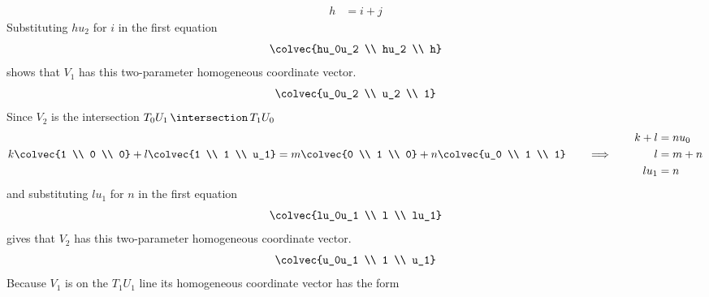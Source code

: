 \begin{ans}{7}
\begin{exparts}
\begin{equation*}
\begin{aligned}
              h    &= i+j
            \end{aligned}
          \end{equation*}
          Substituting $hu_2$ for $i$ in the first equation
          \begin{equation*}
            \colvec{hu_0u_2 \\ hu_2 \\ h}
          \end{equation*}
          shows that $V_1$ has this
          two-parameter homogeneous coordinate vector.
          \begin{equation*}
            \colvec{u_0u_2 \\ u_2 \\ 1}
          \end{equation*}
        \partsitem
           Since $V_2$ is the intersection
           $T_0U_1\,\intersection\,T_1U_0$
           \begin{equation*}
             k\colvec{1 \\ 0 \\ 0}+l\colvec{1 \\ 1 \\ u_1}
              =m\colvec{0 \\ 1 \\ 0}+n\colvec{u_0 \\ 1 \\ 1}
            \qquad\Longrightarrow\qquad
            \begin{aligned}
              k+l  &= nu_0 \\
              l    &= m+n    \\
              lu_1 &= n
            \end{aligned}
           \end{equation*}
           and substituting $lu_1$ for $n$ in the first equation
           \begin{equation*}
             \colvec{lu_0u_1 \\ l \\ lu_1}
           \end{equation*}
           gives that
           $V_2$ has this two-parameter homogeneous coordinate vector.
           \begin{equation*}
             \colvec{u_0u_1 \\ 1 \\ u_1}
           \end{equation*}
        \partsitem
           Because $V_1$ is on the $T_1U_1$ line its
           homogeneous coordinate vector has the form

\end{exparts}
\end{ans}
